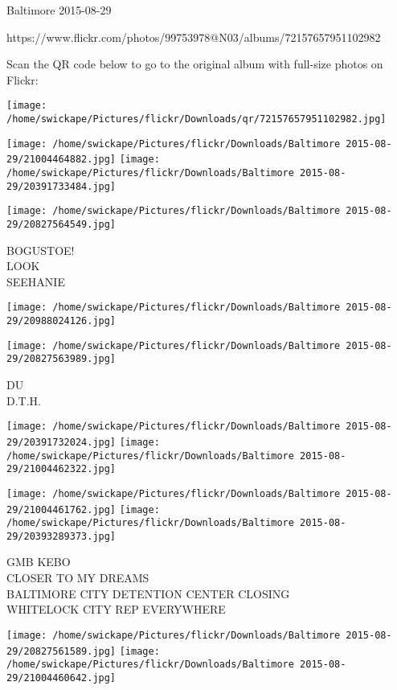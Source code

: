 \documentclass[10pt,letterpaper]{article}
\begin{document}
Baltimore 2015-08-29

https://www.flickr.com/photos/99753978@N03/albums/72157657951102982

Scan the QR code below to go to the original album with full-size photos on Flickr:

\texttt{[image: /home/swickape/Pictures/flickr/Downloads/qr/72157657951102982.jpg]}
\pagebreak

\texttt{[image: /home/swickape/Pictures/flickr/Downloads/Baltimore 2015-08-29/21004464882.jpg]}
\texttt{[image: /home/swickape/Pictures/flickr/Downloads/Baltimore 2015-08-29/20391733484.jpg]}

\vspace{0.25in}
\texttt{[image: /home/swickape/Pictures/flickr/Downloads/Baltimore 2015-08-29/20827564549.jpg]}

BOGUSTOE!\\
LOOK\\
SEEHANIE
\pagebreak

\texttt{[image: /home/swickape/Pictures/flickr/Downloads/Baltimore 2015-08-29/20988024126.jpg]}

\vspace{0.25in}
\texttt{[image: /home/swickape/Pictures/flickr/Downloads/Baltimore 2015-08-29/20827563989.jpg]}

DU\\
D.T.H.
\pagebreak

\texttt{[image: /home/swickape/Pictures/flickr/Downloads/Baltimore 2015-08-29/20391732024.jpg]}
\texttt{[image: /home/swickape/Pictures/flickr/Downloads/Baltimore 2015-08-29/21004462322.jpg]}

\texttt{[image: /home/swickape/Pictures/flickr/Downloads/Baltimore 2015-08-29/21004461762.jpg]}
\texttt{[image: /home/swickape/Pictures/flickr/Downloads/Baltimore 2015-08-29/20393289373.jpg]}

GMB KEBO\\
CLOSER TO MY DREAMS\\
BALTIMORE CITY DETENTION CENTER CLOSING\\
WHITELOCK CITY REP EVERYWHERE
\pagebreak

\texttt{[image: /home/swickape/Pictures/flickr/Downloads/Baltimore 2015-08-29/20827561589.jpg]}
\texttt{[image: /home/swickape/Pictures/flickr/Downloads/Baltimore 2015-08-29/21004460642.jpg]}
\end{document}

